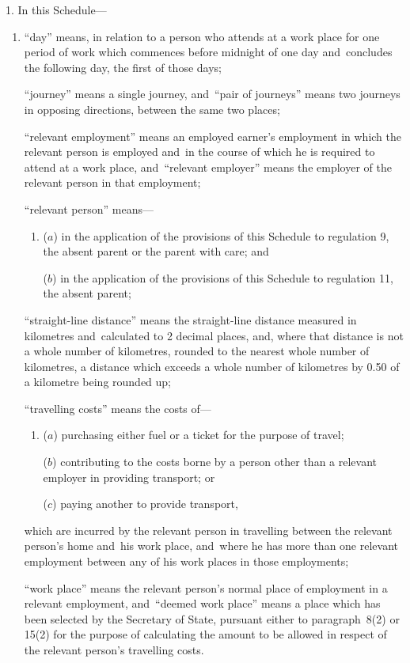 \documentclass[12pt,a4paper]{article}
\begin{document}
1.  In this Schedule—
\begin{enumerate}\item[]
“day” means, in relation to a person who attends at a work place for one period of work which commences before midnight of one day and~concludes the following day, the first of those days;

“journey” means a single journey, and~“pair of journeys” means two journeys in opposing directions, between the same two places;

“relevant employment” means an employed earner’s employment in which the relevant person is employed and~in the course of which he is required to attend at a work place, and~“relevant employer” means the employer of the relevant person in that employment;

“relevant person” means—
\begin{enumerate}\item[]
($a$) in the application of the provisions of this Schedule to regulation 9, the absent parent or the parent with care; and

($b$) in the application of the provisions of this Schedule to regulation 11, the absent parent;
\end{enumerate}


“straight-line distance” means the straight-line distance measured in kilometres and~calculated to 2 decimal places, and, where that distance is not a whole number of kilometres, rounded to the nearest whole number of kilometres, a distance which exceeds a whole number of kilometres by 0$.$50 of a kilometre being rounded up;

“travelling costs” means the costs of—
\begin{enumerate}\item[]
($a$) purchasing either fuel or a ticket for the purpose of travel;

($b$) contributing to the costs borne by a person other than a relevant employer in providing transport; or

($c$) paying another to provide transport,
\end{enumerate}
which are incurred by the relevant person in travelling between the relevant person’s home and~his work place, and~where he has more than one relevant employment between any of his work places in those employments;

“work place” means the relevant person’s normal place of employment in a relevant employment, and~“deemed work place” means a place which has been selected by the 
Secretary of State,  %
pursuant either to paragraph~8(2) or 15(2) for the purpose of calculating the amount to be allowed in respect of the relevant person’s travelling costs.
\end{enumerate}
\end{document}
